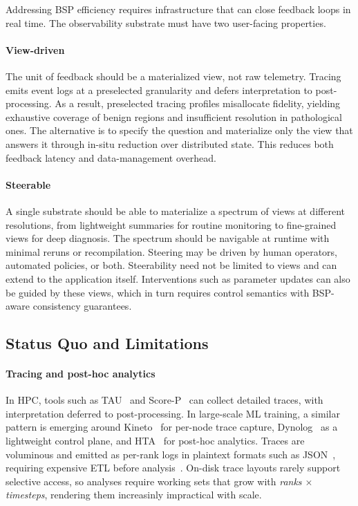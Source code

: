 Addressing BSP efficiency requires infrastructure that can close feedback loops in real time.
The observability substrate must have two user-facing properties.

\paragraph{View-driven}
The unit of feedback should be a materialized view, not raw telemetry.
Tracing emits event logs at a preselected granularity and defers interpretation to post-processing.
As a result, preselected tracing profiles misallocate fidelity, yielding exhaustive coverage of
benign
regions and insufficient resolution in pathological ones.
The alternative is to specify the question and materialize only the view that answers it through
in-situ reduction over distributed state.
This reduces both feedback latency and data-management overhead.

\paragraph{Steerable}
A single substrate should be able to materialize a spectrum of views at different resolutions, from
lightweight summaries for routine monitoring to fine-grained views for deep diagnosis.
The spectrum should be navigable at runtime with minimal reruns or recompilation.
Steering may be driven by human operators, automated policies, or both.
Steerability need not be limited to views and can extend to the application itself.
Interventions such as parameter updates can also be guided by these views, which
in turn requires control semantics with BSP-aware consistency guarantees.


\subsection{Status Quo and Limitations}

\paragraph{Tracing and post-hoc analytics}
In HPC, tools such as TAU~\cite{Shend2006:TAU} and Score-P~\cite{Knupf2012:Score-P} can collect
detailed traces,
with interpretation deferred to post-processing.
In large-scale ML training, a similar pattern is emerging around Kineto~\cite{2025:PytorchKineto}
for per-node trace capture,
Dynolog~\cite{2025:MetaDynolog} as a lightweight control plane, and HTA~\cite{:HTA} for post-hoc
analytics.
Traces are voluminous and emitted as per-rank logs in plaintext formats such as
JSON~\cite{:ChromeJsonTEF},
requiring expensive ETL before analysis~\cite{Yildi2023:IOMax,Jain2025:AMR}.
On-disk trace layouts rarely support selective access, so analyses require working sets that grow
with \emph{ranks $\times$ timesteps},
rendering them increasinly impractical with scale.

